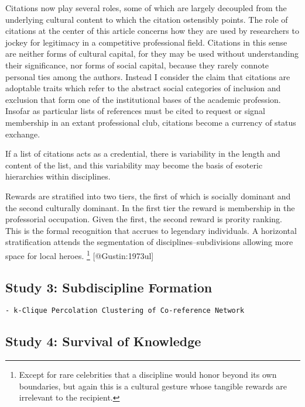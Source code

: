 \documentclass [PhD] {uclathes}
\begin{document}
Citations now play several roles, some of which are largely decoupled
from the underlying cultural content to which the citation ostensibly
points. The role of citations at the center of this article concerns how
they are used by researchers to jockey for legitimacy in a competitive
professional field. Citations in this sense are neither forms of
cultural capital, for they may be used without understanding their
significance, nor forms of social capital, because they rarely connote
personal ties among the authors. Instead I consider the claim that
citations are adoptable traits which refer to the abstract social
categories of inclusion and exclusion that form one of the institutional
bases of the academic profession. Insofar as particular lists of
references must be cited to request or signal membership in an extant
professional club, citations become a currency of status exchange.

If a list of citations acts as a credential, there is variability in the
length and content of the list, and this variability may become the
basis of esoteric hierarchies within disciplines.

Rewards are stratified into two tiers, the first of which is socially
dominant and the second culturally dominant. In the first tier the
reward is membership in the professorial occupation. Given the first,
the second reward is prority ranking. This is the formal recognition
that accrues to legendary individuals. A horizontal stratification
attends the segmentation of disciplines--subdivisions allowing more
space for local heroes. \footnote{Except for rare celebrities that a
  discipline would honor beyond its own boundaries, but again this is a
  cultural gesture whose tangible rewards are irrelevant to the
  recipient.} {[}@Gustin:1973ul{]}

\subsection{Study 3: Subdiscipline
Formation}\label{study-3-subdiscipline-formation}

\begin{verbatim}
- k-Clique Percolation Clustering of Co-reference Network
\end{verbatim}

\subsection{Study 4: Survival of
Knowledge}\label{study-4-survival-of-knowledge}
\end{document}
